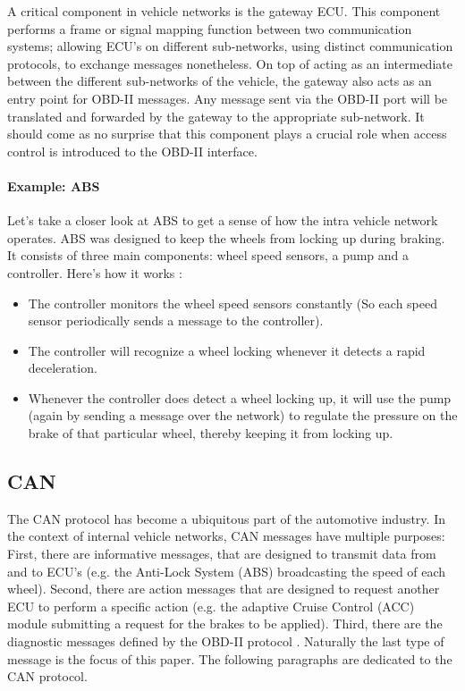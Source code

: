 A critical component in vehicle networks is the gateway ECU. This component performs a frame or signal mapping function between two communication systems; allowing ECU's on different sub-networks, using distinct communication protocols, to exchange messages nonetheless. 
On top of acting as an intermediate between the different sub-networks of the vehicle, the gateway also acts as an entry point for OBD-II messages. Any message sent via the OBD-II port will be translated and forwarded by the gateway to the appropriate sub-network. It should come as no surprise that this component plays a crucial role when access control is introduced to the OBD-II interface.

\paragraph{Example: ABS}
Let's take a closer look at ABS to get a sense of how the intra vehicle network operates. ABS was designed to keep the wheels from locking up during braking. It consists of three main components: wheel speed sensors, a pump and a controller. Here's how it works \cite{wiki:ABS}:

\begin{itemize}
	\item The controller monitors the wheel speed sensors constantly (So each speed sensor periodically sends a message to the controller).
	
	\item The controller will recognize a wheel locking whenever it detects a rapid deceleration.
	
	\item Whenever the controller does detect a wheel locking up, it will use the pump (again by sending a message over the network) to regulate the pressure on the brake of that particular wheel, thereby keeping it from locking up.
\end{itemize}

\subsection{CAN}
\label{sec:can}

The CAN protocol has become a ubiquitous part of the automotive industry. In the context of internal vehicle networks, CAN messages have multiple purposes: First, there are informative messages, that are designed to transmit data from and to ECU's (e.g. the Anti-Lock System (ABS) broadcasting the speed of each wheel). Second, there are action messages that are designed to request another ECU to perform a specific action (e.g. the adaptive Cruise Control (ACC) module submitting a request for the brakes to be applied). Third, there are the diagnostic messages defined by the OBD-II protocol \cite{MillerB}. Naturally the last type of message is the focus of this paper. The following paragraphs are dedicated to the CAN protocol.

